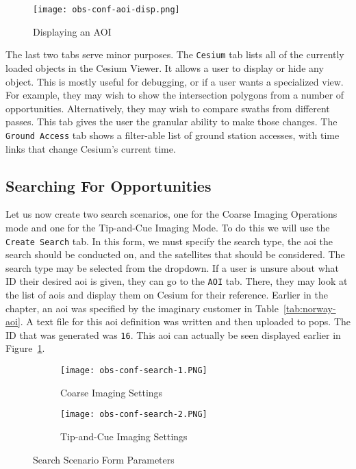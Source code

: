 \begin{figure}[h]
    \centering
    \texttt{[image: obs-conf-aoi-disp.png]} 
    \caption{Displaying an AOI}
    \label{fig:obs-conf-aoi-display} 
\end{figure}

The last two tabs serve minor purposes. The \texttt{Cesium} tab lists all of
the currently loaded objects in the Cesium Viewer. It allows a user to display
or hide any object. This is mostly useful for debugging, or if a user wants a
specialized view. For example, they may wish to show the intersection polygons
from a number of opportunities. Alternatively, they may wish to compare swaths
from different passes. This tab gives the user the granular ability to make
those changes. The \texttt{Ground Access} tab shows a filter-able list of
ground station accesses, with time links that change Cesium's current time.


\subsection{Searching For Opportunities}

Let us now create two search scenarios, one for the Coarse Imaging Operations
mode and one for the Tip-and-Cue Imaging Mode. To do this we will use the
\texttt{Create Search} tab. In this form, we must specify the search type, the
\gls{aoi} the search should be conducted on, and the  satellites that should be
considered. The search type may be selected from the dropdown. If a user
is unsure about what ID their desired \gls{aoi} is given, they can go to the
\texttt{AOI} tab. There, they may look at the list of \glspl{aoi} and display
them on Cesium for their reference. Earlier in the chapter, an \gls{aoi} was
specified by the imaginary customer in Table~\ref{tab:norway-aoi}. A text file
for this \gls{aoi} definition was written and then uploaded to \gls{pops}. The
ID that was generated was \texttt{16}. This \gls{aoi} can actually be seen
displayed earlier in Figure~\ref{fig:obs-conf-aoi-display}.

\begin{figure}[h]
    \centering
    \begin{subfigure}[b]{0.49\textwidth}
	\centering
	\texttt{[image: obs-conf-search-1.PNG]} 
	\caption{Coarse Imaging Settings}
	\label{fig:obs-conf-search-1} 
    \end{subfigure}
    \hfill
    \begin{subfigure}[b]{0.49\textwidth}
	\centering
	\texttt{[image: obs-conf-search-2.PNG]} 
	\caption{Tip-and-Cue Imaging Settings}
	\label{fig:obs-conf-search-2} 
    \end{subfigure}
    \caption{Search Scenario Form Parameters}
    \label{fig:obs-conf-searches} 
\end{figure}


